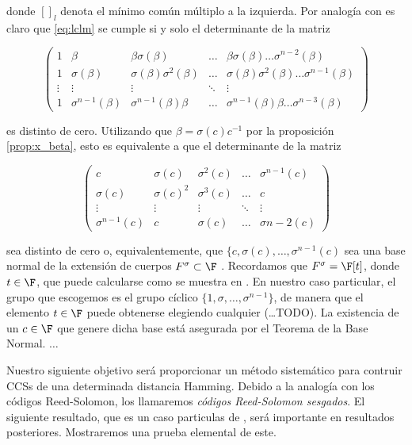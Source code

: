 donde \([]_l\) denota el mínimo común múltiplo a la izquierda. Por analogía con \cite{turing1936a} es claro que
\ref{eq:lclm} se cumple si y solo el determinante de la matriz

\[
\begin{pmatrix}
    1 & \beta & \beta\sigma(\beta) & \dots & \beta\sigma(\beta)\dots\sigma^{n-2}(\beta) \\
    1 & \sigma(\beta) & \sigma(\beta)\sigma^2(\beta) & \dots & \sigma(\beta)\sigma^2(\beta)\dots\sigma^{n-1}(\beta) \\
    \vdots & \vdots & \vdots & \ddots & \vdots \\
    1 & \sigma^{n-1}(\beta) & \sigma^{n-1}(\beta)\beta & \dots & \sigma^{n-1}(\beta)\beta\dots\sigma^{n-3}(\beta)

\end{pmatrix}
\]

es distinto de cero. Utilizando que \(\beta = \sigma(c)c^{-1}\) por la proposición \ref{prop:x_beta}, esto es equivalente a que el determinante de la matriz

\[
\begin{pmatrix}
    c & \sigma(c) & \sigma^2(c) & \dots & \sigma^{n-1}(c) \\
    \sigma(c) & \sigma(c)^2 & \sigma^3(c) & \dots & c \\
    \vdots & \vdots & \vdots & \ddots & \vdots \\
    \sigma^{n-1}(c) & c & \sigma(c) & \dots & \sigma{n-2}(c)
\end{pmatrix}
\]

sea distinto de cero o, equivalentemente, que \(\{c, \sigma(c), \dots, \sigma^{n-1}(c)\) sea una base normal de la extensión de cuerpos \(F^\sigma \subset \F\) \cite{turing1936a}. Recordamos que \(F^\sigma = \F[t]\), donde \(t \in \F\), que puede calcularse como se muestra en \cite{turing1936a}. En nuestro caso particular, el grupo que escogemos es el grupo cíclico \(\{1, \sigma, \dots, \sigma^{n-1}\}\), de manera que el elemento \(t \in \F\) puede obtenerse elegiendo cualquier  (\dots TODO). La existencia de un \(c \in \F\) que genere dicha base está asegurada por el Teorema de la Base Normal. \(\dots\)

Nuestro siguiente objetivo será proporcionar un método sistemático para contruir CCSs de una determinada distancia Hamming. Debido a la analogía con los códigos Reed-Solomon, los llamaremos \textit{códigos Reed-Solomon sesgados}. El siguiente resultado, que es un caso particulas de \cite{turing1936a}, será importante en resultados posteriores. Mostraremos una prueba elemental de este.

